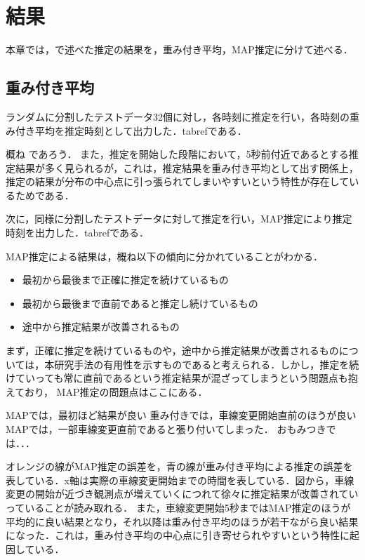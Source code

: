 \chapter{結果}
本章では，で述べた推定の結果を，重み付き平均，MAP推定に分けて述べる．
\section{重み付き平均}
ランダムに分割したテストデータ32個に対し，各時刻に推定を行い，各時刻の重み付き平均を推定時刻として出力した．tabrefである．

概ね
であろう．
また，推定を開始した段階において，5秒前付近であるとする推定結果が多く見られるが，これは，推定結果を重み付き平均として出す関係上，推定の結果が分布の中心点に引っ張られてしまいやすいという特性が存在しているためである．
\par
次に，同様に分割したテストデータに対して推定を行い，MAP推定により推定時刻を出力した．tabrefである．

MAP推定による結果は，概ね以下の傾向に分かれていることがわかる．
\begin{itemize}
	\item 最初から最後まで正確に推定を続けているもの
	\item 最初から最後まで直前であると推定し続けているもの
	\item 途中から推定結果が改善されるもの
\end{itemize}
まず，正確に推定を続けているものや，途中から推定結果が改善されるものについては，本研究手法の有用性を示すものであると考えられる．しかし，推定を続けていっても常に直前であるという推定結果が混ざってしまうという問題点も抱えており，
MAP推定の問題点はここにある．





MAPでは，最初ほど結果が良い
重み付きでは，車線変更開始直前のほうが良い
MAPでは，一部車線変更直前であると張り付いてしまった．
おもみつきでは．．．
\par
% 
オレンジの線がMAP推定の誤差を，青の線が重み付き平均による推定の誤差を表している．x軸は実際の車線変更開始までの時間を表している．図から，車線変更の開始が近づき観測点が増えていくにつれて徐々に推定結果が改善されていっていることが読み取れる．
また，車線変更開始5秒まではMAP推定のほうが平均的に良い結果となり，それ以降は重み付き平均のほうが若干ながら良い結果になった．これは，重み付き平均の中心点に引き寄せられやすいという特性に起因している．
